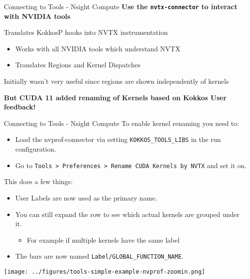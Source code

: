 
\begin{frame}[fragile]{Connecting to Tools - Nsight Compute}
\textbf{Use the \texttt{nvtx-connector} to interact with NVIDIA tools}

\vspace{10pt}
Translates KokkosP hooks into NVTX instrumentation
\begin{itemize}
\item Works with all NVIDIA tools which understand NVTX
\item Translates Regions and Kernel Dispatches
\end{itemize}

\pause
\vspace{10pt}
Initially wasn't very useful since regions are shown independently of kernels

\pause
\vspace{15pt}
\textbf{But CUDA 11 added renaming of Kernels based on Kokkos User feedback!}
\end{frame}

\begin{frame}[fragile]{Connecting to Tools - Nsight Compute}
  To enable kernel renaming you need to:
  \begin{itemize}
    \item Load the nvprof-connector via setting \texttt{KOKKOS\_TOOLS\_LIBS} in the run configuration.
    \item Go to \texttt{Tools > Preferences > Rename CUDA Kernels by NVTX} and set it on.
  \end{itemize}

  This does a few things:
  \begin{itemize}
    \item User Labels are now used as the primary name.
    \item You can still expand the row to see which actual kernels are grouped under it.
    \begin{itemize}
      \item For example if multiple kernels have the same label
    \end{itemize}
    \item The bars are now named \texttt{Label/GLOBAL\_FUNCTION\_NAME}.
  \end{itemize}
  \texttt{[image: ../figures/tools-simple-example-nvprof-zoomin.png]}
\end{frame}



